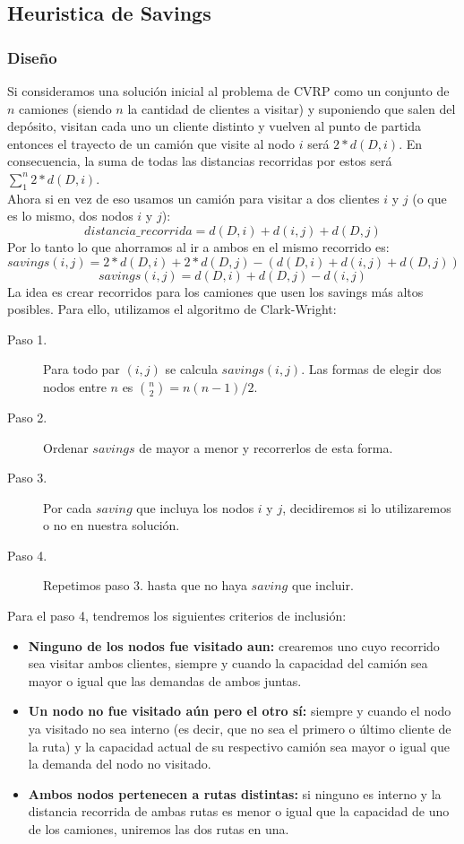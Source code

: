 \subsection{Heuristica de Savings}
\subsubsection{Diseño}
Si consideramos una solución inicial al problema de CVRP como un conjunto de $n$ camiones (siendo $n$ la cantidad de clientes a visitar) y suponiendo que salen del depósito, visitan cada uno un cliente distinto y vuelven al punto de partida entonces el trayecto de un camión que visite al nodo $i$ será $2*d(D,i)$. En consecuencia, la suma de todas las distancias recorridas por estos será $\sum_{1}^{n} 2*d(D, i)$.\\
Ahora si en vez de eso usamos un camión para visitar a dos clientes $i$ y $j$ (o que es lo mismo, dos nodos $i$ y $j$):
$$ distancia\_recorrida = d(D, i) + d(i,j) +d(D, j)     $$
Por lo tanto lo que ahorramos al ir a ambos en el mismo recorrido es:\\
$$ savings(i,j) = 2*d(D, i) + 2* d(D,j) -  (d(D, i) + d(i,j) +d(D, j))     $$
$$ savings(i,j) = d(D, i) + d(D,j) -   d(i,j)    $$
La idea es crear recorridos para los camiones que usen los savings más altos posibles. Para ello, utilizamos el algoritmo de Clark-Wright:

\begin{description}
	\item[Paso 1.] Para todo par $(i,j)$ se calcula $savings(i,j)$. Las formas de elegir dos nodos entre $n$ es ${n}\choose{2}$$ = n(n-1)/2$.
	\item[Paso 2.] Ordenar $savings$ de mayor a menor y recorrerlos de esta forma.
	\item[Paso 3.] Por cada $saving$ que incluya los nodos $i$ y $j$, decidiremos si lo utilizaremos o no en nuestra solución.
	\item[Paso 4.] Repetimos paso 3. hasta que no haya $saving$ que incluir.
\end{description}
Para el paso 4, tendremos los siguientes criterios de inclusión:
\begin{itemize}
	\item \textbf{Ninguno de los nodos fue visitado aun:} crearemos uno cuyo recorrido sea visitar ambos clientes, siempre y cuando la capacidad del camión sea mayor o igual que las demandas de ambos juntas.
	\item \textbf{Un nodo no fue visitado aún pero el otro sí:} siempre y cuando el nodo ya visitado no sea interno (es decir, que no sea el primero o último cliente de la ruta) y la capacidad actual de su respectivo camión sea mayor o igual que la demanda del nodo no visitado.
	\item \textbf{Ambos nodos pertenecen a rutas distintas:} si ninguno es interno y la distancia recorrida de ambas rutas es menor o igual que la capacidad de uno de los camiones, uniremos las dos rutas en una.
\end{itemize}

